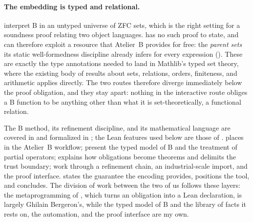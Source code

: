 \paragraph*{The embedding is typed and relational.}
 interpret B in an untyped universe of ZFC sets, which is the right
setting for a soundness proof relating two object languages.
\barrel{} has no such proof to state, and can therefore exploit a resource that
Atelier~B provides for free: the \emph{parent sets} its static well-formedness discipline
already infers for every expression ().
These are exactly the type annotations needed to land in Mathlib's typed set theory, where
the existing body of results about sets, relations, orders, finiteness, and arithmetic
applies directly.
The two routes therefore diverge immediately below the proof obligation, and they stay
apart: nothing in the interactive route obliges a B function to be anything other than what
it is set-theoretically, a functional relation.

The B method, its refinement discipline, and its mathematical language are covered in
 and formalized in ; the Lean features used below are those
of .
 places \barrel{} in the Atelier~B workflow;
 present the typed model of B and the treatment of
partial operators;  explains how obligations become
theorems and delimits the trust boundary;
 work through a refinement chain, an
industrial-scale import, and the proof interface.
 states the guarantee the encoding provides,
 positions the tool, and 
concludes.
The division of work between the two of us follows these layers: the metaprogramming of
, which turns an obligation into a Lean declaration,
is largely Ghilain Bergeron's, while the typed model of B and the library of facts it rests
on, the automation, and the proof interface are my own.

